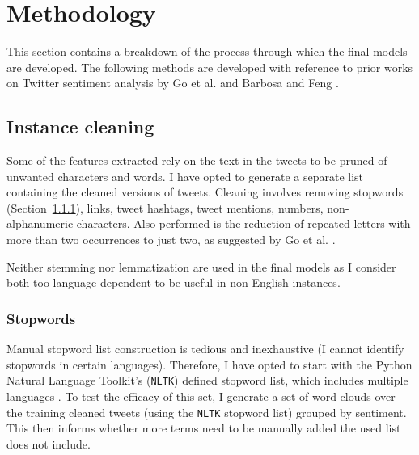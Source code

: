 \documentclass[11pt]{article}
\begin{document}
\section{Methodology}

This section contains a breakdown of the process through which the final models are developed.
The following methods are developed with reference to prior works on {T}witter sentiment analysis by Go et al.  and Barbosa and Feng .

\subsection{Instance cleaning}

Some of the features extracted rely on the text in the tweets to be pruned of unwanted characters and words.
I have opted to generate a separate list containing the cleaned versions of tweets.
Cleaning involves removing stopwords (Section~\ref{sec:stopwords}), links, tweet hashtags, tweet mentions, numbers, non-alphanumeric characters.
Also performed is the reduction of repeated letters with more than two occurrences to just two, as suggested by Go et al. .

Neither stemming nor lemmatization are used in the final models as I consider both too language-dependent
to be useful in non-English instances.

\subsubsection{Stopwords}\label{sec:stopwords}

Manual stopword list construction is tedious and inexhaustive (I cannot identify stopwords in certain languages). 
Therefore, I have opted to start with the {P}ython Natural Language Toolkit's (\texttt{NLTK}) defined stopword list, which includes multiple languages \cite{nltk}.
To test the efficacy of this set, 
I generate a set of word clouds over the training cleaned tweets (using the \texttt{NLTK} stopword list) grouped by sentiment.
This then informs whether more terms need to be manually added the used list does not include.
\end{document}
